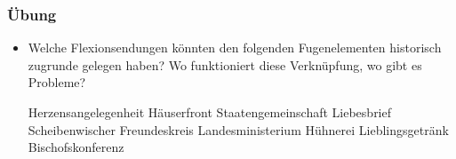 \begin{frame}
	\frametitle{Übung}
	
	\begin{itemize}
		\item Welche Flexionsendungen könnten den folgenden Fugenelementen historisch zugrunde gelegen haben? Wo funktioniert diese Verknüpfung, wo gibt es Probleme?
	
	\begin{multicols}{2}
		\eal
		\ex Herzensangelegenheit
		\ex Häuserfront
		\ex Staatengemeinschaft
		\ex Liebesbrief
		\ex Scheibenwischer
\columnbreak
		\ex Freundeskreis
		\ex Landesministerium
		\ex Hühnerei
		\ex Lieblingsgetränk
		\ex Bischofskonferenz
		\zl
	\end{multicols}

\end{itemize}
\end{frame}



